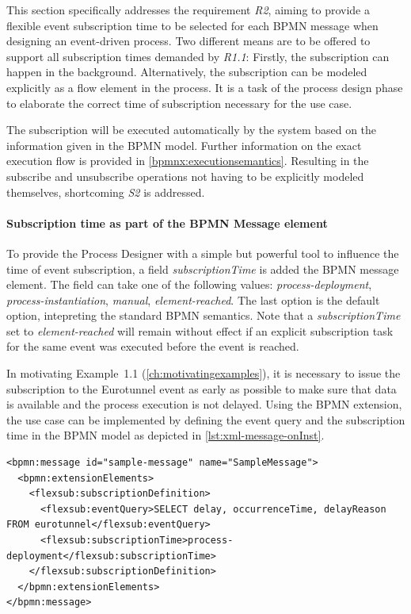This section specifically addresses the requirement \textit{R2}, aiming to provide a flexible event subscription time to be selected for each BPMN message when designing an event-driven process.
Two different means are to be offered to support all subscription times demanded by \textit{R1.1}: Firstly, the subscription can happen in the background. Alternatively, the subscription can be modeled explicitly as a flow element in the process.
It is a task of the process design phase to elaborate the correct time of subscription necessary for the use case.

The subscription will be executed automatically by the system based on the information given in the BPMN model. Further information on the exact execution flow is provided in \autoref{bpmnx:executionsemantics}.
Resulting in the subscribe and unsubscribe operations not having to be explicitly modeled themselves, shortcoming \textit{S2} is addressed.

\pagebreak

\paragraph{Subscription time as part of the BPMN Message element\newline}
To provide the Process Designer with a simple but powerful tool to influence the time of event subscription, a field \textit{subscriptionTime} is added the BPMN message element. 
The field can take one of the following values: \textit{process-deployment}, \textit{process-instantiation}, \textit{manual}, \textit{element-reached}. The last option is the default option, intepreting the standard BPMN semantics.
Note that a \textit{subscriptionTime} set to \textit{element-reached} will remain without effect if an explicit subscription task for the same event was executed before the event is reached.

In motivating Example~1.1 (\autoref{ch:motivatingexamples}), it is necessary to issue the subscription to the Eurotunnel event as early as possible to make sure that data is available and the process execution is not delayed.
Using the BPMN extension, the use case can be implemented by defining the event query and the subscription time in the BPMN model as depicted in \autoref{lst:xml-message-onInst}.

\begin{lstlisting}[caption={XML representation of an extended BPMN Message element},label=lst:xml-message-onInst]
<bpmn:message id="sample-message" name="SampleMessage">
  <bpmn:extensionElements>
    <flexsub:subscriptionDefinition>
      <flexsub:eventQuery>SELECT delay, occurrenceTime, delayReason FROM eurotunnel</flexsub:eventQuery>
      <flexsub:subscriptionTime>process-deployment</flexsub:subscriptionTime>
    </flexsub:subscriptionDefinition>
  </bpmn:extensionElements>
</bpmn:message>
\end{lstlisting}


